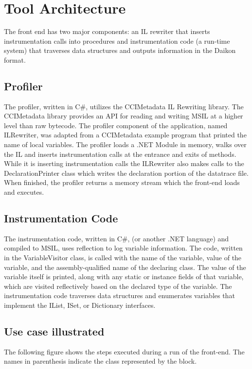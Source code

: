 \documentclass{article}
\begin{document}
\section{Tool Architecture}
The front end has two major components: an IL rewriter that inserts instrumentation calls into procedures and instrumentation code (a run-time system) that traverses data structures and outputs information in the Daikon format.

\subsection{Profiler}
The profiler, written in C\#, utilizes the CCIMetadata IL Rewriting library. The CCIMetadata library provides an API for reading and writing MSIL at a higher level than raw bytecode. The profiler component of the application, named ILRewriter, was adapted from a CCIMetadata example program that printed the name of local variables. The profiler loads a .NET Module in memory, walks over the IL and inserts instrumentation calls at the entrance and exits of methods. While it is inserting instrumentation calls the ILRewriter also makes calls to the DeclarationPrinter class which writes the declaration portion of the datatrace file. When finished, the profiler returns a memory stream which the front-end loads and executes.

\subsection{Instrumentation Code}
The instrumentation code, written in C\#, (or another .NET language) and compiled to MSIL, uses reflection to log variable information. The code, written in the VariableVisitor class, is called with the name of the variable, value of the variable, and the assembly-qualified name of the declaring class. The value of the variable itself is printed, along with any static or instance fields of that variable, which are visited reflectively based on the declared type of the variable. The instrumentation code traverses data structures and enumerates variables that implement the IList, ISet, or Dictionary interfaces. 

\subsection{Use case illustrated}
The following figure shows the steps executed during a run of the front-end. The names in parenthesis indicate the class represented by the block.
\end{document}
